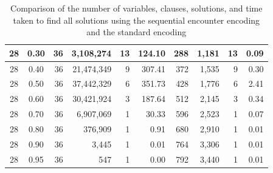 \begin{table}[H]
\begin{tabular}{|c|c|r|r|r|r|r|r|r|r|}
        28                              & 0.30                               & 36                                              & 3,108,274                                          & 13            & 124.10        & 288           & 1,181            & 13            & 0.09          \\ \hline
        28                              & 0.40                               & 36                                              & 21,474,349                                         & 9             & 307.41        & 372           & 1,535            & 9             & 0.30          \\ \hline
        28                              & 0.50                               & 36                                              & 37,442,329                                         & 6             & 351.73        & 428           & 1,776            & 6             & 2.41          \\ \hline
        28                              & 0.60                               & 36                                              & 30,421,924                                         & 3             & 187.64        & 512           & 2,145            & 3             & 0.34          \\ \hline
        28                              & 0.70                               & 36                                              & 6,907,069                                          & 1             & 30.33         & 596           & 2,523            & 1             & 0.07          \\ \hline
        28                              & 0.80                               & 36                                              & 376,909                                            & 1             & 0.91          & 680           & 2,910            & 1             & 0.01          \\ \hline
        28                              & 0.90                               & 36                                              & 3,445                                              & 1             & 0.01          & 764           & 3,306            & 1             & 0.01          \\ \hline
        28                              & 0.95                               & 36                                              & 547                                                & 1             & 0.00          & 792           & 3,440            & 1             & 0.01          \\ \hline
    \end{tabular}
    \caption{Comparison of the number of variables, clauses, solutions, and time taken to find all solutions using the sequential encounter encoding and the standard encoding}
    \label{tab:4_1}
\end{table}

